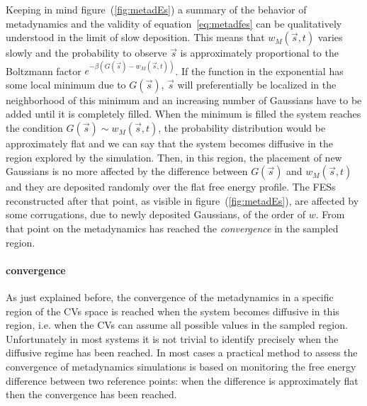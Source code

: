 Keeping in mind figure~(\ref{fig:metadEs}) a summary of the behavior of metadynamics and the validity of
equation~\eqref{eq:metadfes} can be qualitatively understood in the limit of slow deposition. This means that
$w_M(\vec s, t)$ varies slowly and the probability to observe $\vec s$ is approximately proportional to the
Boltzmann factor $e^{-\beta(G(\vec s) - w_M(\vec s, t))}$. If the function in the exponential has some local
minimum due to $G(\vec s)$, $\vec s$ will preferentially be localized in the neighborhood of this minimum and an
increasing number of Gaussians have to be added until it is completely filled. When the minimum is filled the
system reaches the condition $G(\vec s) \sim w_M(\vec s, t)$, the probability distribution would be approximately
flat and we can say that the system becomes diffusive in the region explored by the simulation. Then, in this
region, the placement of new Gaussians is no more affected by the difference between $G(\vec s)$ and
$w_M(\vec s, t)$ and they are deposited randomly over the flat free energy profile. The \acp{FES} reconstructed
after that point, as visible in figure~(\ref{fig:metadEs}), are affected by some corrugations, due to newly
deposited Gaussians, of the order of $w$. From that point on the metadynamics has reached the \textit{convergence}
in the sampled region.

\paragraph{\textbf{convergence}} As just explained before, the convergence of the metadynamics in a specific
region of the \acp{CV} space is reached when the system becomes diffusive in this region, i.e. when the \acp{CV}
can assume all possible values in the sampled region. Unfortunately in most systems it is not trivial to identify 
precisely when the diffusive regime has been reached. In most cases a practical method to assess the convergence 
of metadynamics simulations is based on monitoring the free energy difference between two reference points: when 
the difference is approximately flat then the convergence has been reached.

